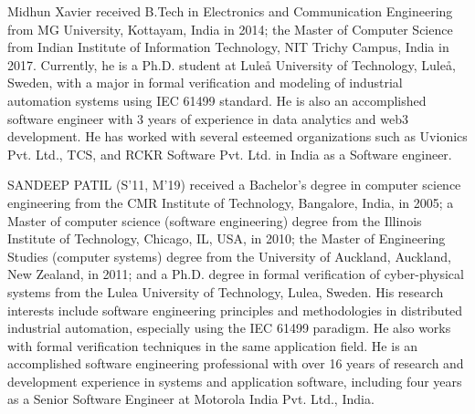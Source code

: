 \documentclass{ieeeojies}
\begin{document}
\begin{IEEEbiography}{Midhun Xavier} received B.Tech in Electronics and Communication Engineering from MG University, Kottayam, India in 2014; the Master of Computer Science from Indian Institute of Information Technology, NIT Trichy Campus, India in 2017. Currently, he is a Ph.D. student at Luleå University of Technology, Luleå, Sweden, with a major in formal verification and modeling of industrial automation systems using IEC 61499 standard. He is also an accomplished software engineer with 3 years of experience in data analytics and web3 development. He has worked with several esteemed organizations such as Uvionics Pvt. Ltd., TCS, and RCKR Software Pvt. Ltd. in India as a Software engineer. 
\end{IEEEbiography}



\begin{IEEEbiography}{SANDEEP PATIL} (S’11, M’19) received a Bachelor’s degree in computer science engineering from the CMR Institute of Technology, Bangalore, India, in 2005; a Master of computer science (software engineering) degree from the Illinois Institute of Technology, Chicago, IL, USA, in 2010; the Master of Engineering Studies (computer systems) degree from the University of Auckland, Auckland, New Zealand, in 2011; and a Ph.D. degree in formal verification of cyber-physical systems from the Lulea University of Technology, Lulea, Sweden. His research interests include software engineering principles and methodologies in distributed industrial automation, especially using the IEC 61499 paradigm. He also works with formal verification techniques in the same application field. He is an accomplished software engineering professional with over 16 years of research and development experience in systems and application software, including four years as a Senior Software Engineer at Motorola India Pvt. Ltd., India.
\end{IEEEbiography}
\end{document}

